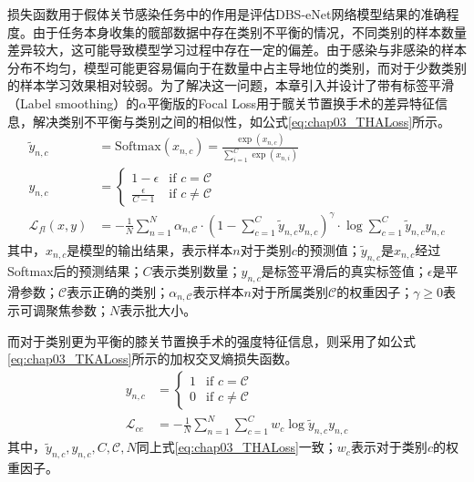 损失函数用于假体关节感染任务中的作用是评估DBS-eNet网络模型结果的准确程度。由于任务本身收集的髋部数据中存在类别不平衡的情况，不同类别的样本数量差异较大，这可能导致模型学习过程中存在一定的偏差。由于感染与非感染的样本分布不均匀，模型可能更容易偏向于在数量中占主导地位的类别，而对于少数类别的样本学习效果相对较弱。为了解决这一问题，本章引入并设计了带有标签平滑（Label smoothing）\cite{zhang2021delving}的\(\alpha\)平衡版的Focal Loss\cite{lin2017focal}用于髋关节置换手术的差异特征信息，解决类别不平衡与类别之间的相似性，如公式\ref{eq:chap03_THALoss}所示。
\begin{equation}
  \begin{aligned}
    \tilde{y}_{n, c}      & =  \text{Softmax}(x_{n, c}) = \frac{\exp(x_{n, c})}{\sum_{i = 1}^{C}\exp(x_{n, i})}                                                                       \\
    y_{n, c}              & =
    \begin{cases}
      1 - \epsilon         & \text{if \(c = \mathcal{C}\)}    \\
      \frac{\epsilon}{C-1} & \text{if \(c \neq \mathcal{C}\)}
    \end{cases}                                                                                                                \\
    \mathcal{L}_{fl}(x,y) & = -\frac{1}{N}\sum_{n=1}^N \alpha_{n,\mathcal{C}} \cdot (1 - \sum_{c=1}^C \tilde{y}_{n,c}y_{n,c})^{\gamma} \cdot \log\sum_{c=1}^{C}\tilde{y}_{n,c}y_{n,c}
  \end{aligned}
  \label{eq:chap03_THALoss}
\end{equation}
其中，\(x_{n,c}\)是模型的输出结果，表示样本\(n\)对于类别\(c\)的预测值；\(\tilde{y}_{n, c}\)是\(x_{n,c}\)经过Softmax后的预测结果；\(C\)表示类别数量；\(y_{n,c}\)是标签平滑后的真实标签值；\(\epsilon\)是平滑参数；\(\mathcal{C}\)表示正确的类别；\(\alpha_{n,\mathcal{C}}\)表示样本\(n\)对于所属类别\(\mathcal{C}\)的权重因子；\(\gamma \geq 0\)表示可调聚焦参数；\(N\)表示批大小。

而对于类别更为平衡的膝关节置换手术的强度特征信息，则采用了如公式\ref{eq:chap03_TKALoss}所示的加权交叉熵损失函数。
\begin{equation}
  \begin{aligned}
    y_{n, c}         & =
    \begin{cases}
      1 & \text{if \(c = \mathcal{C}\)}    \\
      0 & \text{if \(c \neq \mathcal{C}\)}
    \end{cases}                                         \\
    \mathcal{L}_{ce} & = -\frac{1}{N}\sum_{n=1}^N\sum_{c=1}^C w_c\log\tilde{y}_{n,c}y_{n,c}
  \end{aligned}
  \label{eq:chap03_TKALoss}
\end{equation}
其中，\(\tilde{y}_{n, c},y_{n,c},C,\mathcal{C},N\)同上式\ref{eq:chap03_THALoss}一致；\(w_c\)表示对于类别\(c\)的权重因子。

